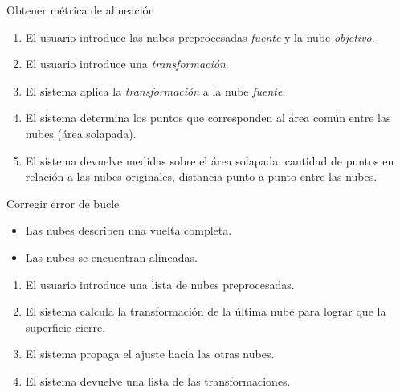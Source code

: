 \begin{CasoDeUso}{Obtener métrica de alineación}
	\CUNormal
	\begin{enumerate}
		\item El usuario introduce las nubes preprocesadas \emph{fuente} y la nube \emph{objetivo}. 
		\item El usuario introduce una \emph{transformación}.
		\item El sistema aplica la \emph{transformación} a la nube \emph{fuente}.
		\item El sistema determina los puntos que corresponden al área común entre las nubes (área solapada).
		\item El sistema devuelve medidas sobre el área solapada:
			cantidad de puntos en relación a las nubes originales,
			distancia punto a punto entre las nubes.
	\end{enumerate}
\end{CasoDeUso}


\begin{CasoDeUso}{Corregir error de bucle}
	\begin{itemize}
		\item Las nubes describen una vuelta completa.
		\item Las nubes se encuentran alineadas.
	\end{itemize}
	\CUNormal
	\begin{enumerate}
		\item El usuario introduce una lista de nubes preprocesadas. 
		\item El sistema calcula la transformación de la última nube para lograr que la superficie cierre. 
		\item El sistema propaga el ajuste hacia las otras nubes.
		\item El sistema devuelve una lista de las transformaciones.
	\end{enumerate}
\end{CasoDeUso}


